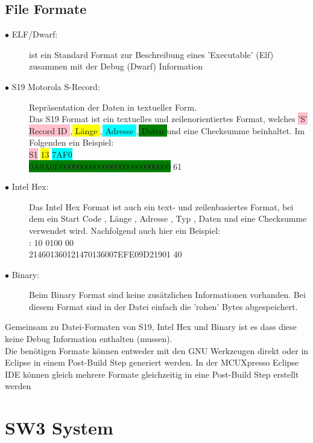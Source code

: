 \documentclass[a4paper, 8pt]{extarticle}
\begin{document}
\begin{multicols*}{3}
			\subsection{File Formate}
				\begin{description}
					\item[$\bullet$ ELF/Dwarf:] ist ein Standard Format zur Beschreibung eines ’Executable’
					(Elf) zusammen mit der Debug (Dwarf) Information
					\item[$\bullet$ S19 Motorola S-Record:] Repräsentation der Daten in textueller Form.\\
					Das S19 Format ist ein textuelles und zeilenorientiertes Format, welches
					\colorbox{pink}{’S’ Record ID },\colorbox{yellow}{ Länge },\colorbox{cyan}{ Adresse },\colorbox{green}{ Daten } und eine Checksumme beinhaltet.
					Im Folgenden ein Beispiel:\\
					\colorbox{pink}{S1} \colorbox{yellow}{13} \colorbox{cyan}{7AF0}\\ \colorbox{green}{0A0A0D00000000000000000000000000} 61
					\item[$\bullet$ Intel Hex:]
					Das Intel Hex Format ist auch ein text- und zeilenbasiertes Format, bei
					dem ein Start Code , Länge , Adresse , Typ , Daten und eine Checksumme
					verwendet wird. Nachfolgend auch hier ein Beispiel:\\
					: 10 0100 00 \\214601360121470136007EFE09D21901 40
					\item[$\bullet$ Binary:] Beim Binary Format sind keine zusätzlichen Informationen vorhanden. Bei
					diesem Format sind in der Datei einfach die ’rohen’ Bytes abgespeichert.\newline 
				\end{description}	
	Gemeinsam zu Datei-Formaten von S19, Intel Hex und Binary ist es dass diese
	keine Debug Information enthalten (mussen).\\
	Die benötigen Formate können entweder mit den GNU Werkzeugen direkt
	oder in Eclipse in einem Post-Build Step generiert werden. In der MCUXpresso
	Eclipse IDE können gleich mehrere Formate gleichzeitig in eine Post-Build Step
	erstellt werden
	
	\section{SW3 System}

\end{multicols*}
\end{document}
